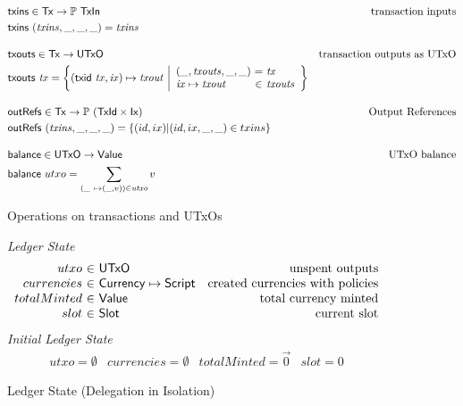 \documentclass[11pt,a4paper]{article}
\newcommand{\powerset}[1]{\mathbb{P}~#1}
\newcommand{\var}[1]{\mathit{#1}}
\newcommand{\fun}[1]{\mathsf{#1}}
\newcommand{\type}[1]{\mathsf{#1}}
\begin{document}
\begin{figure}
\begin{align*}
& \fun{txins} \in \type{Tx} \to \powerset{\type{TxIn}}
& \text{transaction inputs} \\
& \fun{txins} ~ (\var{txins}, \_, \_, \_) = \var{txins}
\\[1em]
& \fun{txouts} \in \type{Tx} \to \type{UTxO}
& \text{transaction outputs as UTxO} \\
& \fun{txouts} ~ \var{tx} =
  \left\{ (\fun{txid} ~ \var{tx}, \var{ix}) \mapsto \var{txout} ~
  \middle| \begin{array}{l@{~}c@{~}l}
             (\_, \var{txouts},\_, \_) & = & \var{tx} \\
             \var{ix} \mapsto \var{txout} & \in & \var{txouts}
           \end{array}
  \right\}
\\[1em]
& \fun{outRefs} \in \type{Tx} \to \powerset({\type{TxId} \times \type{Ix}})
& \text{Output References} \\
	& \fun{outRefs} ~ (\var{txins}, \_, \_, \_)
	    = \left\{ (id, ix) \middle| (id, ix, \_, \_) \in txins\right\}
\\[1em]
& \fun{balance} \in \type{UTxO} \to \type{Value}
& \text{UTxO balance} \\
& \fun{balance} ~ utxo = \sum_{(\_ ~ \mapsto (\_, v)) \in \var{utxo}} v
\end{align*}
\caption{Operations on transactions and UTxOs}
\label{fig:auxiliary_ops}
\end{figure}


\begin{figure}

\emph{Ledger State}
%
\begin{equation*}
\begin{array}{r@{~\in~}lr}
utxo & \type{UTxO} & \text{unspent outputs}
\\
currencies & \type{Currency} \mapsto \type{Script}
  & \text{created currencies with policies}
\\
totalMinted & \type{Value} & \text{total currency minted}
\\
slot & \type{Slot} & \text{current slot}

\end{array}
\end{equation*}
%
\emph{Initial Ledger State}
%
\begin{equation*}
\begin{array}{llllll}
utxo = \emptyset
  & currencies = \emptyset
  & totalMinted = \vec{0}
  & slot = 0
\end{array}
\end{equation*}

\caption{Ledger State (Delegation in Isolation)}
\label{fig:delegation_ledger_state}
\end{figure}
\end{document}
